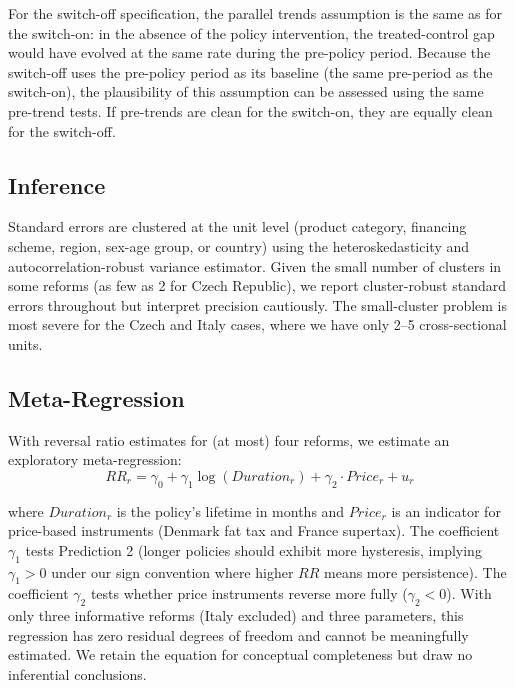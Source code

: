 \documentclass[12pt]{article}
\begin{document}
For the switch-off specification, the parallel trends assumption is the same as for the switch-on: in the absence of the policy intervention, the treated-control gap would have evolved at the same rate during the pre-policy period. Because the switch-off uses the pre-policy period as its baseline (the same pre-period as the switch-on), the plausibility of this assumption can be assessed using the same pre-trend tests. If pre-trends are clean for the switch-on, they are equally clean for the switch-off.

\subsection{Inference}

Standard errors are clustered at the unit level (product category, financing scheme, region, sex-age group, or country) using the \citet{heckman1998characterizing} heteroskedasticity and autocorrelation-robust variance estimator. Given the small number of clusters in some reforms (as few as 2 for Czech Republic), we report cluster-robust standard errors throughout but interpret precision cautiously. The small-cluster problem is most severe for the Czech and Italy cases, where we have only 2--5 cross-sectional units.

\subsection{Meta-Regression}

With reversal ratio estimates for (at most) four reforms, we estimate an exploratory meta-regression:
\begin{equation}
RR_r = \gamma_0 + \gamma_1 \log(Duration_r) + \gamma_2 \cdot Price_r + u_r
\label{eq:meta}
\end{equation}

\noindent where $Duration_r$ is the policy's lifetime in months and $Price_r$ is an indicator for price-based instruments (Denmark fat tax and France supertax). The coefficient $\gamma_1$ tests Prediction 2 (longer policies should exhibit more hysteresis, implying $\gamma_1 > 0$ under our sign convention where higher $RR$ means more persistence). The coefficient $\gamma_2$ tests whether price instruments reverse more fully ($\gamma_2 < 0$). With only three informative reforms (Italy excluded) and three parameters, this regression has zero residual degrees of freedom and cannot be meaningfully estimated. We retain the equation for conceptual completeness but draw no inferential conclusions.
\end{document}
